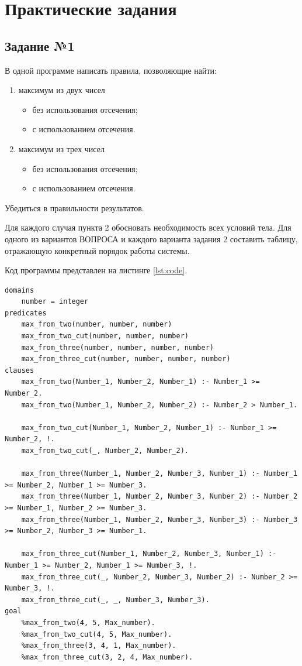 \chapter{Практические задания}
\section{Задание №1}
В одной программе написать правила, позволяющие найти:
\begin{enumerate}
	\item максимум из двух чисел 
		\begin{itemize}
			\item без использования отсечения;
			\item с использованием отсечения.
		\end{itemize}
	\item максимум из трех чисел
		\begin{itemize}
			\item без использования отсечения;
			\item с использованием отсечения.
		\end{itemize}
\end{enumerate}

Убедиться в правильности результатов.

Для каждого случая пункта 2 обосновать необходимость всех условий тела.
Для одного из вариантов ВОПРОСА и каждого варианта задания 2 составить
таблицу, отражающую конкретный порядок работы системы.

Код программы представлен на листинге \ref{lst:code}.
\newpage
\begin{lstlisting}[label=lst:code, basicstyle=\footnotesize, caption=Код программы]
domains
	number = integer
predicates
	max_from_two(number, number, number)
	max_from_two_cut(number, number, number)
	max_from_three(number, number, number, number)
	max_from_three_cut(number, number, number, number)
clauses
	max_from_two(Number_1, Number_2, Number_1) :- Number_1 >= Number_2.
	max_from_two(Number_1, Number_2, Number_2) :- Number_2 > Number_1.
	
	max_from_two_cut(Number_1, Number_2, Number_1) :- Number_1 >= Number_2, !.
	max_from_two_cut(_, Number_2, Number_2).
	
	max_from_three(Number_1, Number_2, Number_3, Number_1) :- Number_1 >= Number_2, Number_1 >= Number_3.
	max_from_three(Number_1, Number_2, Number_3, Number_2) :- Number_2 >= Number_1, Number_2 >= Number_3.
	max_from_three(Number_1, Number_2, Number_3, Number_3) :- Number_3 >= Number_2, Number_3 >= Number_1.
	
	max_from_three_cut(Number_1, Number_2, Number_3, Number_1) :- Number_1 >= Number_2, Number_1 >= Number_3, !.
	max_from_three_cut(_, Number_2, Number_3, Number_2) :- Number_2 >= Number_3, !.
	max_from_three_cut(_, _, Number_3, Number_3).
goal
	%max_from_two(4, 5, Max_number).
	%max_from_two_cut(4, 5, Max_number).
	%max_from_three(3, 4, 1, Max_number).
	%max_from_three_cut(3, 2, 4, Max_number).
\end{lstlisting}

